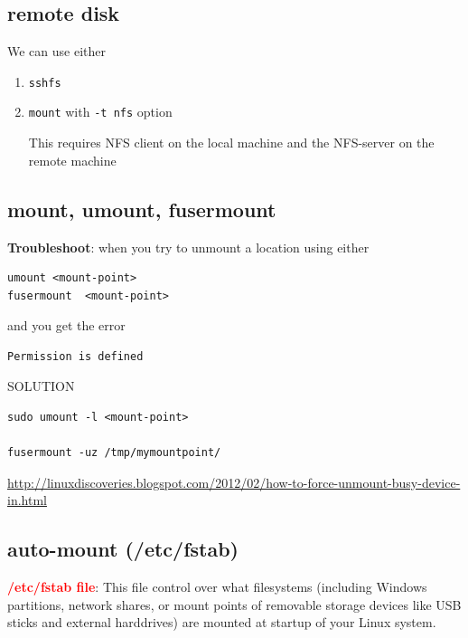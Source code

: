 \subsection{remote disk}

We can use either
\begin{enumerate}
  \item \verb!sshfs!
  
  
  \item \verb!mount! with \verb!-t nfs! option
  
This requires NFS client on the local machine and the NFS-server on the remote
machine

\end{enumerate}

\subsection{mount, umount, fusermount}

{\bf Troubleshoot}:  when you try to unmount a location using either
\begin{verbatim}
umount <mount-point>
fusermount  <mount-point>
\end{verbatim}
and you get the error
\begin{verbatim}
Permission is defined
\end{verbatim}

SOLUTION
\begin{verbatim}
sudo umount -l <mount-point>

fusermount -uz /tmp/mymountpoint/ 
\end{verbatim}
\url{http://linuxdiscoveries.blogspot.com/2012/02/how-to-force-unmount-busy-device-in.html}


\subsection{auto-mount (/etc/fstab)}
\label{sec:automount}
\label{sec:etc/fstab}

\textcolor{red}{\bf /etc/fstab file}: This file control over what filesystems
(including Windows partitions, network shares, or mount points of removable
storage devices like USB sticks and external harddrives) are mounted at startup
of your Linux system.

